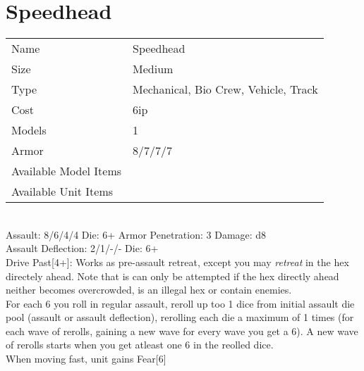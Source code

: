 






\pagebreak

\section{ Speedhead }

\begin{tabular}{ll}
  Name & Speedhead \\
  Size & Medium\\
  Type & Mechanical, Bio Crew, Vehicle, Track\\
  Cost & 6ip\\
  Models & 1\\
  Armor & 8/7/7/7\\
  Available Model Items &  \\
  Available Unit Items &  \\
\end{tabular}

\ \\
Assault: 8/6/4/4 Die: 6+ Armor Penetration: 3 Damage: d8 \\
Assault Deflection: 2/1/-/- Die: 6+\\
\indent Drive Past[4+]: Works as pre-assault retreat, except you may {\it retreat} in the hex directely ahead. Note that is can only be attempted if the hex directly ahead neither becomes overcrowded, is an illegal hex or contain enemies. \\ For each 6 you roll in regular assault, reroll up too 1 dice from initial assault die pool (assault or assault deflection), rerolling each die a maximum of 1 times (for each wave of rerolls, gaining a new wave for every wave you get a 6). A new wave of rerolls starts when you get atleast one 6 in the reolled dice. \\ When moving fast, unit gains Fear[6] \\
\ \\


